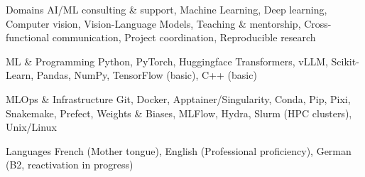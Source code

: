 

\begin{cvskills}

  \cvskill
    {Domains} %
    {AI/ML consulting \& support, Machine Learning, Deep learning, Computer vision, Vision-Language Models, Teaching \& mentorship, Cross-functional communication, Project coordination, Reproducible research} %

  \cvskill
    {ML \& Programming} %
    {Python, PyTorch, Huggingface Transformers, vLLM, Scikit-Learn, Pandas, NumPy, TensorFlow (basic), C++ (basic)} %

  \cvskill
    {MLOps \& Infrastructure} %
    {Git, Docker, Apptainer/Singularity, Conda, Pip, Pixi, Snakemake, Prefect, Weights \& Biases, MLFlow, Hydra, Slurm (HPC clusters), Unix/Linux} %

  \cvskill
    {Languages} %
    {French (Mother tongue), English (Professional proficiency), German (B2, reactivation in progress)} %

\end{cvskills}

